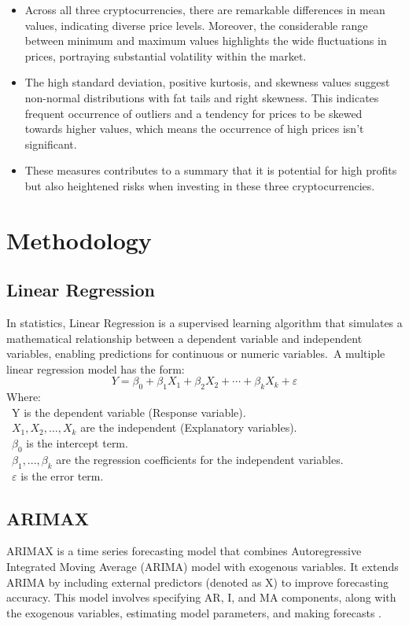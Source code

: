 \documentclass{ieeeojies}
\begin{document}
\begin{itemize}
    \item Across all three cryptocurrencies, there are remarkable differences in mean values, indicating diverse price levels. Moreover, the considerable range between minimum and maximum values highlights the wide fluctuations in prices, portraying substantial volatility within the market.
    \item The high standard deviation, positive kurtosis, and skewness values suggest non-normal distributions with fat tails and right skewness. This indicates frequent occurrence of outliers and a tendency for prices to be skewed towards higher values, which means the occurrence of high prices isn't significant.
    \item These measures contributes to a summary that it is potential for high profits but also heightened risks when investing in these three cryptocurrencies.

\end{itemize}

\section{Methodology}
\subsection{Linear Regression}
In statistics, Linear Regression is a supervised learning algorithm that simulates a mathematical relationship between a dependent variable and independent
variables, enabling predictions for continuous or numeric variables.\
A multiple linear regression model has the form:
\[Y=\beta_0+\beta_1X_1+\beta_2X_2+\cdots+\beta_kX_k+\varepsilon\]
Where:\\
\indent\textbullet\ Y is the dependent variable (Response variable).\\
\indent\textbullet\ \(X_1, X_2, \ldots, X_k\) are the independent (Explanatory variables).\\
\indent\textbullet\ \(\beta_0\) is the intercept term.\\
\indent\textbullet\ \(\beta_1,..., \beta_k\) are the regression coefficients for the independent variables.\\
\indent\textbullet\ \(\varepsilon\) is the error term.
\subsection{ARIMAX}
\justify
ARIMAX is a time series forecasting model that combines Autoregressive Integrated Moving Average (ARIMA) model with exogenous variables. It extends  ARIMA by  including external  predictors  (denoted as  X) to improve  forecasting accuracy.  This model involves  specifying AR, I,  and MA components,  along with the  exogenous variables, estimating model parameters, and making forecasts \cite{b3}.\\
\end{document}
